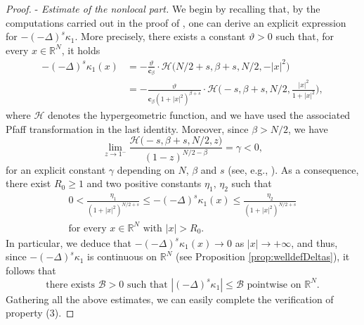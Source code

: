 \documentclass[11pt,a4paper,reqno]{amsart}
\def \R {\mathbb{R}}
\theoremstyle{definition}
\theoremstyle{plain}
\numberwithin{equation}{section}
\begin{document}
\begin{proof}
\noindent-\,\,\emph{Estimate of the nonlocal part.}
We begin by recalling that, by the computations carried out in the proof of \cite[Corollary 4.1]{FerrVerb}, one can derive an explicit expression for $-(-\Delta)^s\kappa_1$. More precisely, there exists a constant $\vartheta > 0$ such that, for every $x\in\mathbb{R}^N$, it holds
\begin{align*}
-(-\Delta)^s\kappa_1(x)
&= -\frac{\vartheta}{\mathbf{c}_\beta}\cdot\mathcal{H}\big(N/2+s,\beta+s,N/2,-|x|^2\big) \\
&= -\frac{\vartheta}{\mathbf{c}_\beta(1+|x|^2)^{\beta+s}}\cdot
\mathcal{H}\Big(-s,\beta+s,N/2,\frac{|x|^2}{1+|x|^2}\Big),
\end{align*}
where $\mathcal{H}$ denotes the hypergeometric function, and we have used the associated Pfaff transformation in the last identity.
Moreover, since $\beta > {N}/{2}$, we have
$$
\lim_{z\to 1^-}\frac{\mathcal{H}\big(-s,\beta+s,N/2,z\big)}{(1-z)^{N/2-\beta}} = \gamma < 0,
$$
for an explicit constant $\gamma$ depending on $N$, $\beta$ and $s$ (see, e.g., \cite[Chapters 15.2, 15.4]{DLMF}).
As a consequence, there exist $R_0 \geq 1$ and two positive constants $\eta_1,\,\eta_2$ such that
\begin{equation} \label{eq:Deltaskappageq}
\begin{gathered}
0 < \frac{\eta_1}{(1+|x|^2)^{N/2+s}}
\leq -(-\Delta)^s\kappa_1(x)
\leq \frac{\eta_2}{(1+|x|^2)^{N/2+s}} \\[0.1cm]
\text{for every $x\in\R^N$ with $|x| > R_0$}.
\end{gathered}
\end{equation}
In particular, we deduce that $-(-\Delta)^s\kappa_1(x)\to 0$ as $|x|\to +\infty$, and thus, since $-(-\Delta)^s\kappa_1$ is continuous on $\R^N$ (see Proposition \ref{prop:welldefDeltas}), it follows that
\begin{equation} \label{eq:DeltaskappaBd}
\text{there exists $\mathcal{B} > 0$ such that $|(-\Delta)^s\kappa_1|\leq \mathcal{B}$ pointwise on $\R^N$}.
\end{equation}
Gathering all the above estimates, we can easily complete the verification of property (3).


\end{proof}
\end{document}
